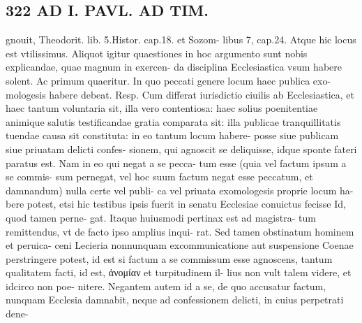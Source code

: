\documentclass{article}
\begin{document}
\begin{pages}
\section*{322 AD I. PAVL. AD TIM. }\pstart gnouit, Theodorit. lib. 5.Histor. cap.18. et Sozom- libus 7, cap.24. Atque hic locus est vtilissimus. Aliquot igitur quaestiones in hoc argumento sunt nobis explicandae, quae magnum in exercen- da disciplina Ecclesiastica vsum habere solent. Ac primum quaeritur. In quo peccati genere locum haec publica exo- mologesis habere debeat. Resp. Cum differat iurisdictio ciuilis ab Ecclesiastica, et haec tantum voluntaria sit, illa vero contentiosa: haec solius poenitentiae animique salutis testificandae gratia comparata sit: illa publicae tranquillitatis tuendae causa sit constituta: in eo tantum locum habere- posse siue publicam siue priuatam delicti confes- sionem, qui agnoscit se deliquisse, idque sponte fateri paratus est. Nam in eo qui negat a se pecca- tum esse (quia vel factum ipsum a se commis- sum pernegat, vel hoc suum factum negat esse peccatum, et damnandum) nulla certe vel publi- ca vel priuata exomologesis proprie locum ha- bere potest, etsi hic testibus ipsis fuerit in senatu Ecclesiae conuictus fecisse Id, quod tamen perne- gat. Itaque huiusmodi pertinax est ad magistra- tum remittendus, vt de facto ipso amplius inqui- rat. Sed tamen obstinatum hominem et peruica- ceni Lecieria nonnunquam excommunicatione aut suspensione Coenae perstringere potest, id est si factum a se commissum esse agnoscens, tantum qualitatem facti, id est, ἀνομίαν et turpitudinem il- lius non vult talem videre, et idcirco non poe- nitere. Negantem autem id a se, de quo accusatur factum, nunquam Ecclesia damnabit, neque ad confessionem delicti, in cuius perpetrati dene-  \pend

\end{pages}
\end{document}
